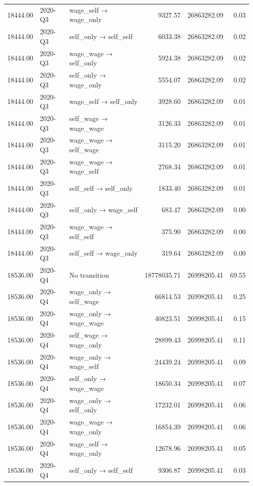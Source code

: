 \begin{table}[ht]
{\begin{tabular}{rllrrr}
  18444.00 & 2020-Q3 & wage\_self → wage\_only & 9327.57 & 26863282.09 & 0.03 \\ 
  18444.00 & 2020-Q3 & self\_only → self\_self & 6033.38 & 26863282.09 & 0.02 \\ 
  18444.00 & 2020-Q3 & wage\_wage → self\_only & 5924.38 & 26863282.09 & 0.02 \\ 
  18444.00 & 2020-Q3 & self\_only → wage\_only & 5554.07 & 26863282.09 & 0.02 \\ 
  18444.00 & 2020-Q3 & wage\_self → self\_only & 3928.60 & 26863282.09 & 0.01 \\ 
  18444.00 & 2020-Q3 & self\_wage → wage\_wage & 3126.33 & 26863282.09 & 0.01 \\ 
  18444.00 & 2020-Q3 & wage\_wage → self\_wage & 3115.20 & 26863282.09 & 0.01 \\ 
  18444.00 & 2020-Q3 & wage\_wage → wage\_self & 2768.34 & 26863282.09 & 0.01 \\ 
  18444.00 & 2020-Q3 & self\_self → self\_only & 1833.40 & 26863282.09 & 0.01 \\ 
  18444.00 & 2020-Q3 & self\_only → wage\_self & 683.47 & 26863282.09 & 0.00 \\ 
  18444.00 & 2020-Q3 & wage\_wage → self\_self & 375.90 & 26863282.09 & 0.00 \\ 
  18444.00 & 2020-Q3 & self\_self → wage\_only & 319.64 & 26863282.09 & 0.00 \\ 
  18536.00 & 2020-Q4 & No transition & 18778035.71 & 26998205.41 & 69.55 \\ 
  18536.00 & 2020-Q4 & wage\_only → self\_wage & 66814.53 & 26998205.41 & 0.25 \\ 
  18536.00 & 2020-Q4 & wage\_only → wage\_wage & 40823.51 & 26998205.41 & 0.15 \\ 
  18536.00 & 2020-Q4 & self\_wage → wage\_only & 28899.43 & 26998205.41 & 0.11 \\ 
  18536.00 & 2020-Q4 & wage\_only → wage\_self & 24439.24 & 26998205.41 & 0.09 \\ 
  18536.00 & 2020-Q4 & self\_only → wage\_wage & 18650.34 & 26998205.41 & 0.07 \\ 
  18536.00 & 2020-Q4 & wage\_only → self\_only & 17232.01 & 26998205.41 & 0.06 \\ 
  18536.00 & 2020-Q4 & wage\_wage → wage\_only & 16854.39 & 26998205.41 & 0.06 \\ 
  18536.00 & 2020-Q4 & wage\_self → wage\_only & 12678.96 & 26998205.41 & 0.05 \\ 
  18536.00 & 2020-Q4 & self\_only → self\_self & 9306.87 & 26998205.41 & 0.03 \\ 

\end{tabular}}
\end{table}
